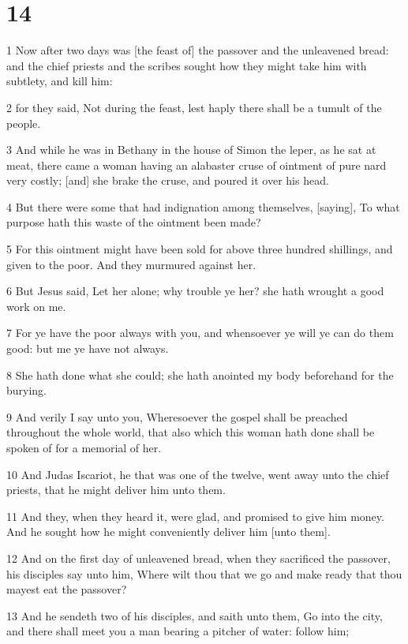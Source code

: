 \chapter{14}

\par 1 Now after two days was [the feast of] the passover and the unleavened bread: and the chief priests and the scribes sought how they might take him with subtlety, and kill him:
\par 2 for they said, Not during the feast, lest haply there shall be a tumult of the people.
\par 3 And while he was in Bethany in the house of Simon the leper, as he sat at meat, there came a woman having an alabaster cruse of ointment of pure nard very costly; [and] she brake the cruse, and poured it over his head.
\par 4 But there were some that had indignation among themselves, [saying], To what purpose hath this waste of the ointment been made?
\par 5 For this ointment might have been sold for above three hundred shillings, and given to the poor. And they murmured against her.
\par 6 But Jesus said, Let her alone; why trouble ye her? she hath wrought a good work on me.
\par 7 For ye have the poor always with you, and whensoever ye will ye can do them good: but me ye have not always.
\par 8 She hath done what she could; she hath anointed my body beforehand for the burying.
\par 9 And verily I say unto you, Wheresoever the gospel shall be preached throughout the whole world, that also which this woman hath done shall be spoken of for a memorial of her.
\par 10 And Judas Iscariot, he that was one of the twelve, went away unto the chief priests, that he might deliver him unto them.
\par 11 And they, when they heard it, were glad, and promised to give him money. And he sought how he might conveniently deliver him [unto them].
\par 12 And on the first day of unleavened bread, when they sacrificed the passover, his disciples say unto him, Where wilt thou that we go and make ready that thou mayest eat the passover?
\par 13 And he sendeth two of his disciples, and saith unto them, Go into the city, and there shall meet you a man bearing a pitcher of water: follow him;
